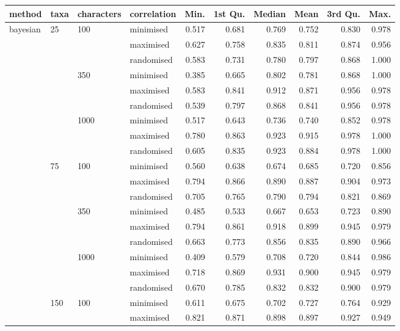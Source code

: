 \begin{longtable}{llllrrrrrr}
  \hline
method & taxa & characters & correlation & Min. & 1st Qu. & Median & Mean & 3rd Qu. & Max. \\ 
  \hline
bayesian & 25 & 100 & minimised & 0.517 & 0.681 & 0.769 & 0.752 & 0.830 & 0.978 \\ 
   &  &  & maximised & 0.627 & 0.758 & 0.835 & 0.811 & 0.874 & 0.956 \\ 
   &  &  & randomised & 0.583 & 0.731 & 0.780 & 0.797 & 0.868 & 1.000 \\ 
   &  & 350 & minimised & 0.385 & 0.665 & 0.802 & 0.781 & 0.868 & 1.000 \\ 
   &  &  & maximised & 0.583 & 0.841 & 0.912 & 0.871 & 0.956 & 0.978 \\ 
   &  &  & randomised & 0.539 & 0.797 & 0.868 & 0.841 & 0.956 & 0.978 \\ 
   &  & 1000 & minimised & 0.517 & 0.643 & 0.736 & 0.740 & 0.852 & 0.978 \\ 
   &  &  & maximised & 0.780 & 0.863 & 0.923 & 0.915 & 0.978 & 1.000 \\ 
   &  &  & randomised & 0.605 & 0.835 & 0.923 & 0.884 & 0.978 & 1.000 \\ 
   & 75 & 100 & minimised & 0.560 & 0.638 & 0.674 & 0.685 & 0.720 & 0.856 \\ 
   &  &  & maximised & 0.794 & 0.866 & 0.890 & 0.887 & 0.904 & 0.973 \\ 
   &  &  & randomised & 0.705 & 0.765 & 0.790 & 0.794 & 0.821 & 0.869 \\ 
   &  & 350 & minimised & 0.485 & 0.533 & 0.667 & 0.653 & 0.723 & 0.890 \\ 
   &  &  & maximised & 0.794 & 0.861 & 0.918 & 0.899 & 0.945 & 0.979 \\ 
   &  &  & randomised & 0.663 & 0.773 & 0.856 & 0.835 & 0.890 & 0.966 \\ 
   &  & 1000 & minimised & 0.409 & 0.579 & 0.708 & 0.720 & 0.844 & 0.986 \\ 
   &  &  & maximised & 0.718 & 0.869 & 0.931 & 0.900 & 0.945 & 0.979 \\ 
   &  &  & randomised & 0.670 & 0.785 & 0.832 & 0.832 & 0.900 & 0.979 \\ 
   & 150 & 100 & minimised & 0.611 & 0.675 & 0.702 & 0.727 & 0.764 & 0.929 \\ 
   &  &  & maximised & 0.821 & 0.871 & 0.898 & 0.897 & 0.927 & 0.949 \\ 

\end{longtable}
